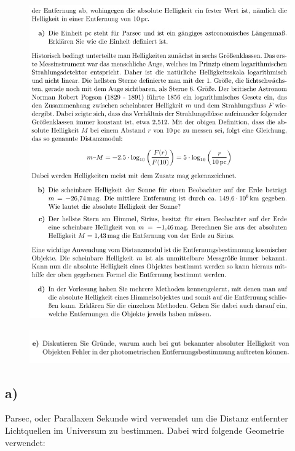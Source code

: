     \begin{figure}[H]
        \centering
        \includegraphics[width=\linewidth]{images/Aufgabe11_2.jpg}
        \label{fig:3}
    \end{figure}

    \begin{figure}[H]
        \centering
        \includegraphics[width=\linewidth]{images/Aufgabe11_3.jpg}
        \label{fig:4}
    \end{figure}

    \subsection{a)}

    \justifying Parsec, oder Parallaxen Sekunde wird verwendet um die Distanz entfernter Lichtquellen im Universum 
    zu bestimmen. Dabei wird folgende Geometrie verwendet:

